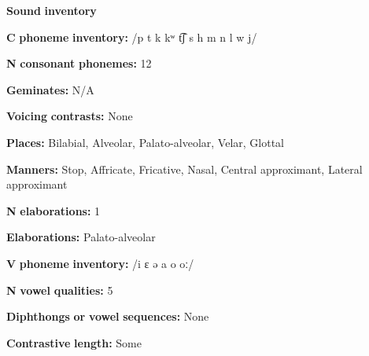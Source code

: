 \documentclass[output=paper]{langsci/langscibook}
\begin{document}
\begin{styleBody}
\textbf{Sound} \textbf{inventory}
\end{styleBody}

\begin{styleBody}
\textbf{C} \textbf{phoneme} \textbf{inventory:} /p t k kʷ t͡ʃ s h m n l w j/
\end{styleBody}

\begin{styleBody}
\textbf{N} \textbf{consonant} \textbf{phonemes:} 12
\end{styleBody}

\begin{styleBody}
\textbf{Geminates:} N/A
\end{styleBody}

\begin{styleBody}
\textbf{Voicing} \textbf{contrasts:} None
\end{styleBody}

\begin{styleBody}
\textbf{Places:} Bilabial, Alveolar, Palato-alveolar, Velar, Glottal
\end{styleBody}

\begin{styleBody}
\textbf{Manners:} Stop, Affricate, Fricative, Nasal, Central approximant, Lateral approximant
\end{styleBody}

\begin{styleBody}
\textbf{N} \textbf{elaborations:} 1
\end{styleBody}

\begin{styleBody}
\textbf{Elaborations:} Palato-alveolar
\end{styleBody}

\begin{styleBody}
\textbf{V} \textbf{phoneme} \textbf{inventory:} /i ɛ ə a o oː/
\end{styleBody}

\begin{styleBody}
\textbf{N} \textbf{vowel} \textbf{qualities:} 5
\end{styleBody}

\begin{styleBody}
\textbf{Diphthongs} \textbf{or} \textbf{vowel} \textbf{sequences:} None
\end{styleBody}

\begin{styleBody}
\textbf{Contrastive} \textbf{length:} Some
\end{styleBody}
\end{document}
